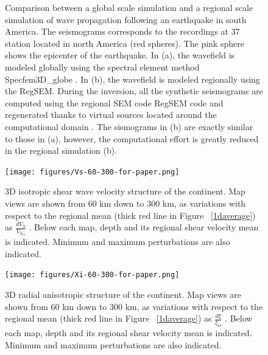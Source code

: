 \documentclass[12pt]{article}
\begin{document}
\begin{figure}
		\caption{\baselineskip 18pt 
			Comparison between a global scale simulation and a regional scale simulation of wave propagation following an earthquake in south America. The seismograms corresponds to the recordings at 37 station located in north America (red spheres).
			The pink sphere shows the epicenter of the earthquake. In (a), the wavefield is modeled globally using the spectral element method Specfem3D\_globe \citep{komatitsch2002spectrala}. In (b), the wavefield is modeled regionally using the RegSEM. During the inversion, all the synthetic seismograms are computed using the regional SEM code RegSEM \citep{cupillard2012regsem} code and regenerated thanks to virtual sources located around the computational domain \citep[see][]{masson2013numerical}. The sismograms in (b) are exactly similar to those in (a), however, the computational effort is greatly reduced in the regional simulation (b).}

		\label{injection}

	\end{figure}

	\begin{figure}
		\centering
		\texttt{[image: figures/Vs-60-300-for-paper.png]}

		\caption{\baselineskip 18pt
		3D isotropic shear wave velocity structure of the continent. Map views are shown from 60 km down to 300 km, as variations with respect to the regional mean (thick red line in Figure ~\ref{1daverage}) as $\frac{dV_S}{V_{S_{O}}}$ . 
		Below each map, depth and its regional shear velocity mean is indicated. Minimum and maximum perturbations are also indicated.
		}

		\label{3d-VS}

	\end{figure}

	\begin{figure}
		\centering
		\texttt{[image: figures/Xi-60-300-for-paper.png]}

		\caption{\baselineskip 18pt
		3D radial anisotropic structure of the continent. Map views are shown from 60 km down to 300 km, as variations with respect to the regional mean (thick red line in Figure ~\ref{1daverage}) as $\frac{d\xi}{\xi_{O}}$ . 
		Below each map, depth and its regional shear velocity mean is indicated. Minimum and maximum perturbations are also indicated.
		}

		\label{3d-Xi}

	\end{figure}
\end{document}
